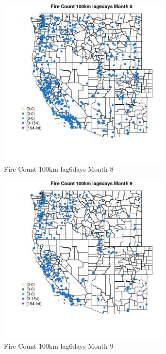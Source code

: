 \begin{figure} 
\centering  
\includegraphics[width=0.77\textwidth]{Code_Outputs/Report_ML_input_PM25_Step4_part_e_de_duplicated_aves_compiled_2019-05-18wNAs_MapObsMo8Fire_Count_100km_lag6days.jpg} 
\caption{\label{fig:Report_ML_input_PM25_Step4_part_e_de_duplicated_aves_compiled_2019-05-18wNAsMapObsMo8Fire_Count_100km_lag6days}Fire Count 100km lag6days Month 8} 
\end{figure} 
 

\begin{figure} 
\centering  
\includegraphics[width=0.77\textwidth]{Code_Outputs/Report_ML_input_PM25_Step4_part_e_de_duplicated_aves_compiled_2019-05-18wNAs_MapObsMo9Fire_Count_100km_lag6days.jpg} 
\caption{\label{fig:Report_ML_input_PM25_Step4_part_e_de_duplicated_aves_compiled_2019-05-18wNAsMapObsMo9Fire_Count_100km_lag6days}Fire Count 100km lag6days Month 9} 
\end{figure} 
 

